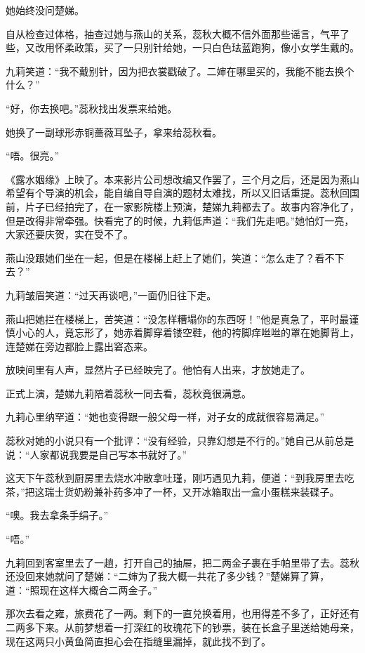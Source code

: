 \par 她始终没问楚娣。
\par 自从检查过体格，抽查过她与燕山的关系，蕊秋大概不信外面那些谣言，气平了些，又改用怀柔政策，买了一只别针给她，一只白色珐蓝跑狗，像小女学生戴的。
\par 九莉笑道：“我不戴别针，因为把衣裳戳破了。二婶在哪里买的，我能不能去换个什么？”
\par “好，你去换吧。”蕊秋找出发票来给她。
\par 她换了一副球形赤铜蔷薇耳坠子，拿来给蕊秋看。
\par “唔。很亮。”
\par 《露水姻缘》上映了。本来影片公司想改编又作罢了，三个月之后，还是因为燕山希望有个导演的机会，能自编自导自演的题材太难找，所以又旧话重提。蕊秋回国前，片子已经拍完了，在一家影院楼上预演，楚娣九莉都去了。故事内容净化了，但是改得非常牵强。快看完了的时候，九莉低声道：“我们先走吧。”她怕灯一亮，大家还要庆贺，实在受不了。
\par 燕山没跟她们坐在一起，但是在楼梯上赶上了她们，笑道：“怎么走了？看不下去？”
\par 九莉皱眉笑道：“过天再谈吧，”一面仍旧往下走。
\par 燕山把她拦在楼梯上，苦笑道：“没怎样糟塌你的东西呀！”他是真急了，平时最谨慎小心的人，竟忘形了，她赤着脚穿着镂空鞋，他的袴脚痒咝咝的罩在她脚背上，连楚娣在旁边都脸上露出窘态来。
\par 放映间里有人声，显然片子已经映完了。他怕有人出来，才放她走了。
\par 正式上演，楚娣九莉陪着蕊秋一同去看，蕊秋竟很满意。
\par 九莉心里纳罕道：“她也变得跟一般父母一样，对子女的成就很容易满足。”
\par 蕊秋对她的小说只有一个批评：“没有经验，只靠幻想是不行的。”她自己从前总是说：“人家都说我要是自己写本书就好了。”
\par 这天下午蕊秋到厨房里去烧水冲散拿吐瑾，刚巧遇见九莉，便道：“到我房里去吃茶，”把这瑞士货奶粉兼补药多冲了一杯，又开冰箱取出一盒小蛋糕来装碟子。
\par “噢。我去拿条手绢子。”
\par “唔。”
\par 九莉回到客室里去了一趟，打开自己的抽屉，把二两金子裹在手帕里带了去。蕊秋还没回来她就问了楚娣：“二婶为了我大概一共花了多少钱？”楚娣算了算，道：“照现在这样大概合二两金子。”
\par 那次去看之雍，旅费花了一两。剩下的一直兑换着用，也用得差不多了，正好还有二两多下来。从前梦想着一打深红的玫瑰花下的钞票，装在长盒子里送给她母亲，现在这两只小黄鱼简直担心会在指缝里漏掉，就此找不到了。
